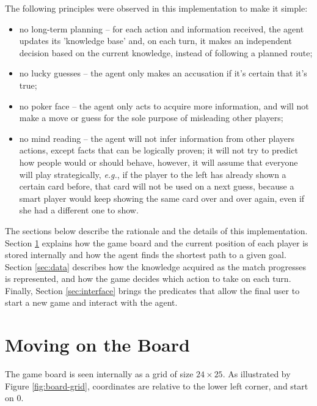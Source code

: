 \documentclass[12pt,a4paper]{article}
\begin{document}
The following principles were observed in this implementation to make it simple:
\begin{itemize}
    \item no long-term planning -- for each action and information received, the agent updates its 'knowledge base' and, on each turn, it makes an independent decision based on the current knowledge, instead of following a planned route;
    
    \item no lucky guesses -- the agent only makes an accusation if it's certain that it's true;
    
    \item no poker face -- the agent only acts to acquire more information, and will not make a move or guess for the sole purpose of misleading other players;
    
    \item no mind reading -- the agent will not infer information from other players actions, except facts that can be logically proven; it will not try to predict how people would or should behave, however, it will assume that everyone will play strategically, \textit{e.g.}, if the player to the left has already shown a certain card before, that card will not be used on a next guess, because a smart player would keep showing the same card over and over again, even if she had a different one to show.
\end{itemize}

The sections below describe the rationale and the details of this implementation. Section \ref{sec:board} explains how the game board and the current position of each player is stored internally and how the agent finds the shortest path to a given goal. Section \ref{sec:data} describes how the knowledge acquired as the match progresses is represented, and how the game decides which action to take on each turn. Finally, Section \ref{sec:interface} brings the predicates that allow the final user to start a new game and interact with the agent.

\section{Moving on the Board}
\label{sec:board}

The game board is seen internally as a grid of size $24\times25$. As illustrated by Figure \ref{fig:board-grid}, coordinates are relative to the lower left corner, and start on $0$.
\end{document}
